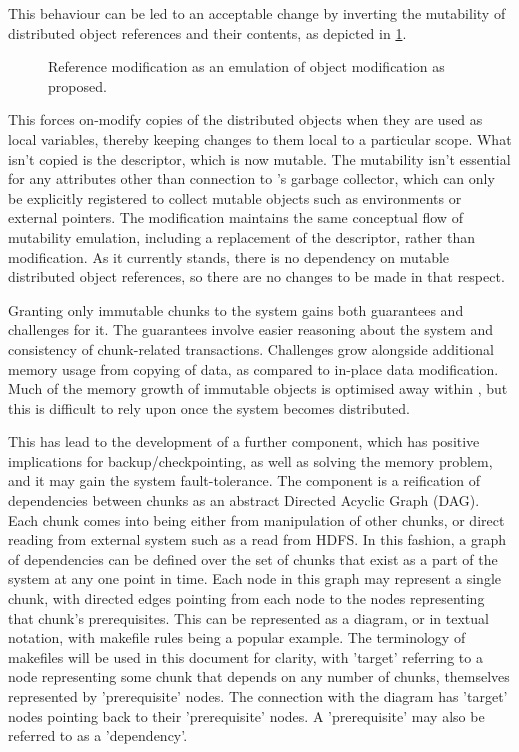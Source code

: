 This behaviour can be led to an acceptable change by inverting the mutability of distributed object references and their contents, as depicted in \cref{fig:modifyrefprop}.

\begin{figure}

\caption{Reference modification as an emulation of object modification as proposed.}
\label{fig:modifyrefprop}
\end{figure}

This forces on-modify copies of the distributed objects when they are used as local variables, thereby keeping changes to them local to a particular scope.
What isn't copied is the descriptor, which is now mutable.
The mutability isn't essential for any attributes other than connection to \R{}'s garbage collector, which can only be explicitly registered to collect mutable objects such as environments or external pointers.
The modification maintains the same conceptual flow of mutability emulation, including a replacement of the descriptor, rather than modification.
As it currently stands, there is no \lsr{} dependency on mutable distributed object references, so there are no changes to be made in that respect.

Granting only immutable chunks to the \lsr{} system gains both guarantees and challenges for it.
The guarantees involve easier reasoning about the system and consistency of chunk-related transactions\cite{goetz2006java}.
Challenges grow alongside additional memory usage from copying of data, as compared to in-place data modification.
Much of the memory growth of immutable objects is optimised away within \R{}, but this is difficult to rely upon once the system becomes distributed\cite{rcore2020lang}.

This has lead to the development of a further component, which has positive implications for backup/checkpointing, as well as solving the memory problem, and it may gain the system fault-tolerance.
The component is a reification of dependencies between chunks as an abstract Directed Acyclic Graph (DAG).
Each chunk comes into being either from manipulation of other chunks, or direct reading from external system such as a read from HDFS.
In this fashion, a graph of dependencies can be defined over the set of chunks that exist as a part of the system at any one point in time.
Each node in this graph may represent a single chunk, with directed edges pointing from each node to the nodes representing that chunk's prerequisites.
This can be represented as a diagram, or in textual notation, with makefile rules being a popular example\cite{shal2009build}.
The terminology of makefiles will be used in this document for clarity, with 'target' referring to a node representing some chunk that depends on any number of chunks, themselves represented by 'prerequisite' nodes. 
The connection with the diagram has 'target' nodes pointing back to their 'prerequisite' nodes.
A 'prerequisite' may also be referred to as a 'dependency'.

